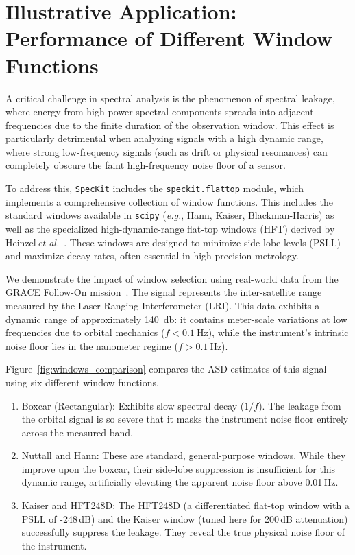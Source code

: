 \documentclass[final, 5p, times, twocolumn, number, sort&compress]{elsarticle}
\newcommand{\eg}{\textit{e.g.}}
\newcommand{\etal}{\,\textit{et al.}}
\newcommand{\speckit}{\texttt{SpecKit}}
\newcommand{\sci}{\texttt{scipy}}
\begin{document}
\section{Illustrative Application: Performance of Different Window Functions}
\label{sec:application-1}

A critical challenge in spectral analysis is the phenomenon of spectral leakage, where energy from high-power spectral components spreads into adjacent frequencies due to the finite duration of the observation window. This effect is particularly detrimental when analyzing signals with a high dynamic range, where strong low-frequency signals (such as drift or physical resonances) can completely obscure the faint high-frequency noise floor of a sensor.

To address this, \speckit{} includes the \texttt{speckit.flattop} module, which implements a comprehensive collection of window functions. This includes the standard windows available in \sci{} (\eg, Hann, Kaiser, Blackman-Harris) as well as the specialized high-dynamic-range flat-top windows (HFT) derived by Heinzel\etal{}~\cite{Heinzel2002TN}. These windows are designed to minimize side-lobe levels (PSLL) and maximize decay rates, often essential in high-precision metrology.

We demonstrate the impact of window selection using real-world data from the GRACE Follow-On mission~\cite{Sheard2012, GRACEFO}. The signal represents the inter-satellite range measured by the Laser Ranging Interferometer (LRI). This data exhibits a dynamic range of approximately \qty{140}{\decibel}: it contains meter-scale variations at low frequencies due to orbital mechanics ($f < \qty{0.1}{\hertz}$), while the instrument's intrinsic noise floor lies in the nanometer regime ($f > \qty{0.1}{\hertz}$).

Figure~\ref{fig:windows_comparison} compares the ASD estimates of this signal using six different window functions.
\begin{enumerate}
    \item {Boxcar (Rectangular):} Exhibits slow spectral decay ($1/f$). The leakage from the orbital signal is so severe that it masks the instrument noise floor entirely across the measured band.
    \item {Nuttall and Hann:} These are standard, general-purpose windows. While they improve upon the boxcar, their side-lobe suppression is insufficient for this dynamic range, artificially elevating the apparent noise floor above 0.01\,Hz.
    \item {Kaiser and HFT248D:} The HFT248D (a differentiated flat-top window with a PSLL of -248\,dB) and the Kaiser window (tuned here for 200\,dB attenuation) successfully suppress the leakage. They reveal the true physical noise floor of the instrument.
\end{enumerate}
\end{document}
